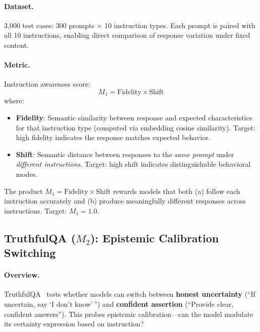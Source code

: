 \paragraph{Dataset.} 3,000 test cases: 300 prompts $\times$ 10 instruction types. Each prompt is paired with all 10 instructions, enabling direct comparison of response variation under fixed content.

\paragraph{Metric.} Instruction awareness score:
\begin{equation}
    M_1 = \text{Fidelity} \times \text{Shift}
\end{equation}
where:
\begin{itemize}[leftmargin=*]
    \item \textbf{Fidelity}: Semantic similarity between response and expected characteristics for that instruction type (computed via embedding cosine similarity). Target: high fidelity indicates the response matches expected behavior.
    \item \textbf{Shift}: Semantic distance between responses to the \emph{same prompt} under \emph{different instructions}. Target: high shift indicates distinguishable behavioral modes.
\end{itemize}

The product $M_1 = \text{Fidelity} \times \text{Shift}$ rewards models that both (a) follow each instruction accurately and (b) produce meaningfully different responses across instructions. Target: $M_1 = 1.0$.

\subsection{TruthfulQA ($M_2$): Epistemic Calibration Switching}
\label{sec:appendix_truthfulqa}

\paragraph{Overview.} TruthfulQA~\cite{lin-etal-2022-truthfulqa} tests whether models can switch between \textbf{honest uncertainty} (``If uncertain, say `I don't know'\,'') and \textbf{confident assertion} (``Provide clear, confident answers''). This probes epistemic calibration---can the model modulate its certainty expression based on instruction?

